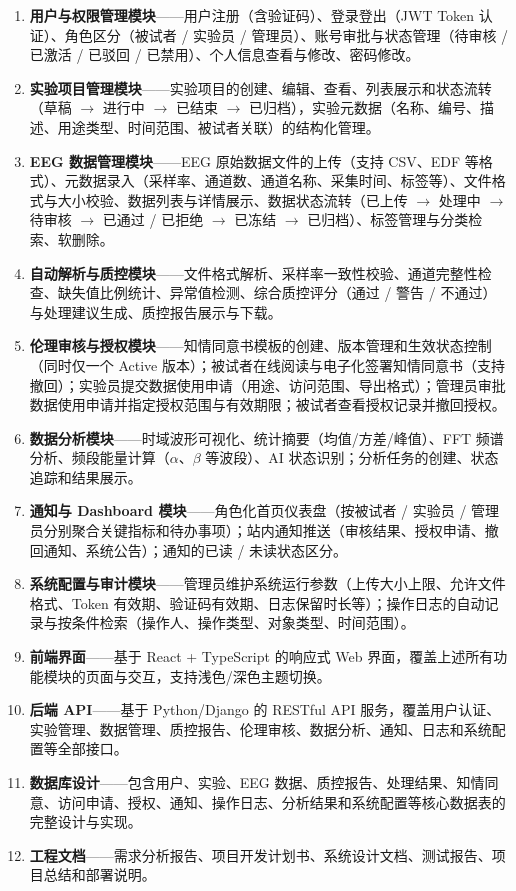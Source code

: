 \begin{enumerate}
  \item \textbf{用户与权限管理模块}——用户注册（含验证码）、登录登出（JWT Token 认证）、角色区分（被试者 / 实验员 / 管理员）、账号审批与状态管理（待审核 / 已激活 / 已驳回 / 已禁用）、个人信息查看与修改、密码修改。
  \item \textbf{实验项目管理模块}——实验项目的创建、编辑、查看、列表展示和状态流转（草稿 $\to$ 进行中 $\to$ 已结束 $\to$ 已归档），实验元数据（名称、编号、描述、用途类型、时间范围、被试者关联）的结构化管理。
  \item \textbf{EEG 数据管理模块}——EEG 原始数据文件的上传（支持 CSV、EDF 等格式）、元数据录入（采样率、通道数、通道名称、采集时间、标签等）、文件格式与大小校验、数据列表与详情展示、数据状态流转（已上传 $\to$ 处理中 $\to$ 待审核 $\to$ 已通过 / 已拒绝 $\to$ 已冻结 $\to$ 已归档）、标签管理与分类检索、软删除。
  \item \textbf{自动解析与质控模块}——文件格式解析、采样率一致性校验、通道完整性检查、缺失值比例统计、异常值检测、综合质控评分（通过 / 警告 / 不通过）与处理建议生成、质控报告展示与下载。
  \item \textbf{伦理审核与授权模块}——知情同意书模板的创建、版本管理和生效状态控制（同时仅一个 Active 版本）；被试者在线阅读与电子化签署知情同意书（支持撤回）；实验员提交数据使用申请（用途、访问范围、导出格式）；管理员审批数据使用申请并指定授权范围与有效期限；被试者查看授权记录并撤回授权。
  \item \textbf{数据分析模块}——时域波形可视化、统计摘要（均值/方差/峰值）、FFT 频谱分析、频段能量计算（$\alpha$、$\beta$ 等波段）、AI 状态识别；分析任务的创建、状态追踪和结果展示。
  \item \textbf{通知与 Dashboard 模块}——角色化首页仪表盘（按被试者 / 实验员 / 管理员分别聚合关键指标和待办事项）；站内通知推送（审核结果、授权申请、撤回通知、系统公告）；通知的已读 / 未读状态区分。
  \item \textbf{系统配置与审计模块}——管理员维护系统运行参数（上传大小上限、允许文件格式、Token 有效期、验证码有效期、日志保留时长等）；操作日志的自动记录与按条件检索（操作人、操作类型、对象类型、时间范围）。
  \item \textbf{前端界面}——基于 React + TypeScript 的响应式 Web 界面，覆盖上述所有功能模块的页面与交互，支持浅色/深色主题切换。
  \item \textbf{后端 API}——基于 Python/Django 的 RESTful API 服务，覆盖用户认证、实验管理、数据管理、质控报告、伦理审核、数据分析、通知、日志和系统配置等全部接口。
  \item \textbf{数据库设计}——包含用户、实验、EEG 数据、质控报告、处理结果、知情同意、访问申请、授权、通知、操作日志、分析结果和系统配置等核心数据表的完整设计与实现。
  \item \textbf{工程文档}——需求分析报告、项目开发计划书、系统设计文档、测试报告、项目总结和部署说明。
\end{enumerate}

